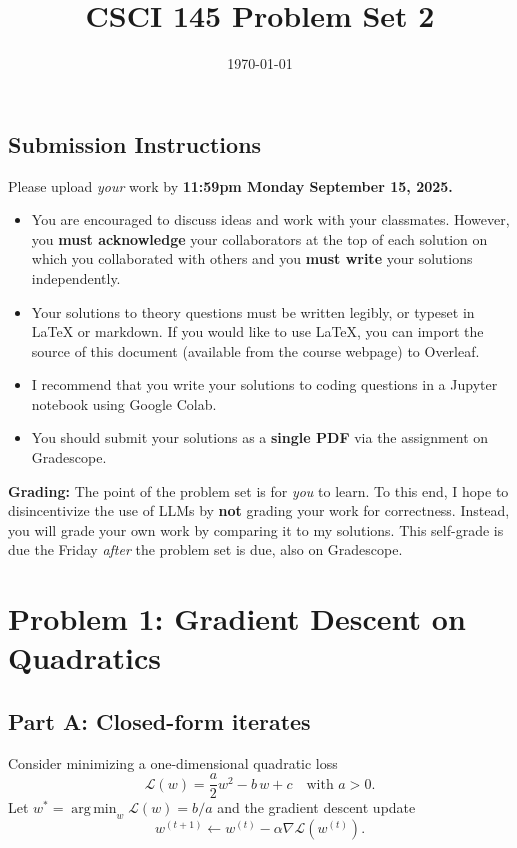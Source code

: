 \documentclass{article}
\title{CSCI 145 Problem Set 2}
\author{} %
\date{\today}
\DeclareMathOperator*{\argmin}{arg\,min}
\begin{document}
\maketitle

\subsection*{Submission Instructions}

Please upload \textit{your} work by
\textbf{11:59pm Monday September 15, 2025.}
\begin{itemize}
\item You are encouraged to discuss ideas
and work with your classmates. However, you
\textbf{must acknowledge} your collaborators
at the top of each solution on which
you collaborated with others 
and you \textbf{must write} your solutions
independently.
\item Your solutions to theory questions must
be written legibly, or typeset in LaTeX or markdown.
If you would like to use LaTeX, you can import the source of this document (available from the course webpage) to Overleaf.
\item I recommend that you write your solutions to coding questions in a Jupyter notebook using Google Colab.
\item You should submit your solutions as a \textbf{single PDF} via the assignment on Gradescope.
\end{itemize}

\noindent
\textbf{Grading:} The point of the problem set is for \textit{you} to learn. To this end, I hope to disincentivize the use of LLMs by \textbf{not} grading your work for correctness. Instead, you will grade your own work by comparing it to my solutions. This self-grade is due the Friday \textit{after} the problem set is due, also on Gradescope.

\newpage
\section*{Problem 1: Gradient Descent on Quadratics}

\subsection*{Part A: Closed-form iterates}
Consider minimizing a one-dimensional quadratic loss
\[
\mathcal{L}(w) = \frac{a}{2} w^2 - b\, w + c
\quad\text{with } a>0.
\]
Let $w^* = \argmin_w \mathcal{L}(w) = b/a$ and the gradient descent update
\[
w^{(t+1)} \gets w^{(t)} - \alpha \nabla \mathcal{L}(w^{(t)}).
\]
\end{document}
